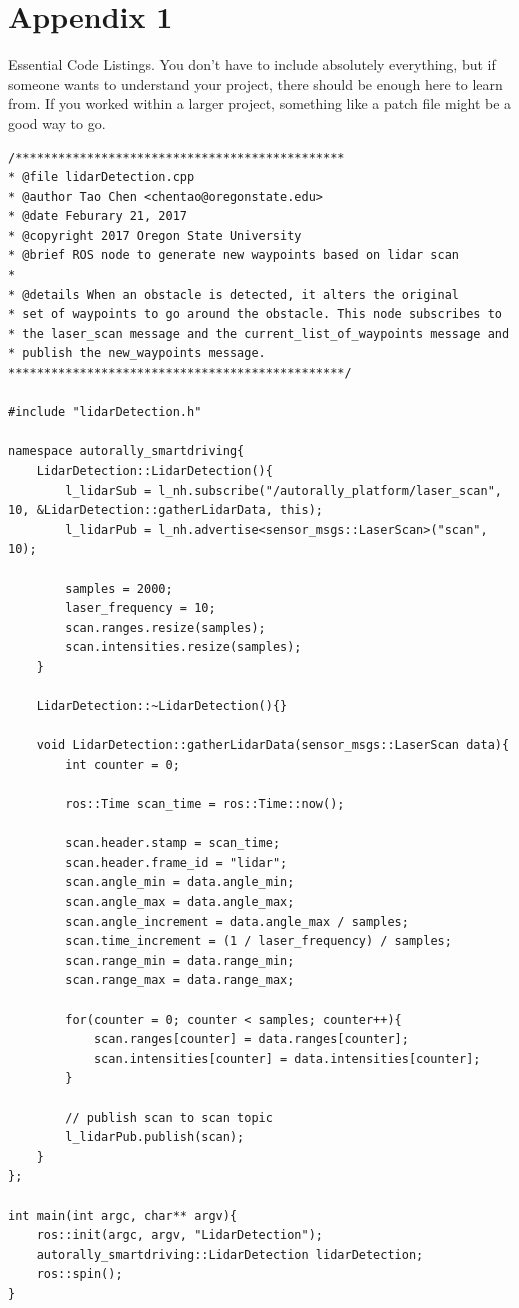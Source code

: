 \documentclass[compsoc,draftclsnofoot,onecolumn,10pt]{IEEEtran}
\begin{document}
\section{Appendix 1}
Essential Code Listings. You don't have to include absolutely everything, but if someone wants to understand your project, there should be enough here to learn from. If you worked within a larger project, something like a patch file might be a good way to go.
\begin{lstlisting}[frame=single,caption={Example Custom ROS Node}]
/**********************************************
* @file lidarDetection.cpp
* @author Tao Chen <chentao@oregonstate.edu>
* @date Feburary 21, 2017
* @copyright 2017 Oregon State University
* @brief ROS node to generate new waypoints based on lidar scan
*
* @details When an obstacle is detected, it alters the original
* set of waypoints to go around the obstacle. This node subscribes to
* the laser_scan message and the current_list_of_waypoints message and
* publish the new_waypoints message.
***********************************************/

#include "lidarDetection.h"

namespace autorally_smartdriving{
	LidarDetection::LidarDetection(){
		l_lidarSub = l_nh.subscribe("/autorally_platform/laser_scan", 10, &LidarDetection::gatherLidarData, this);
		l_lidarPub = l_nh.advertise<sensor_msgs::LaserScan>("scan", 10);

		samples = 2000;
		laser_frequency = 10;
		scan.ranges.resize(samples);
		scan.intensities.resize(samples);
	}

	LidarDetection::~LidarDetection(){}

	void LidarDetection::gatherLidarData(sensor_msgs::LaserScan data){
		int counter = 0;

		ros::Time scan_time = ros::Time::now();

		scan.header.stamp = scan_time;
		scan.header.frame_id = "lidar";
		scan.angle_min = data.angle_min;
		scan.angle_max = data.angle_max;
		scan.angle_increment = data.angle_max / samples;
		scan.time_increment = (1 / laser_frequency) / samples;
		scan.range_min = data.range_min;
		scan.range_max = data.range_max;

		for(counter = 0; counter < samples; counter++){
			scan.ranges[counter] = data.ranges[counter];
			scan.intensities[counter] = data.intensities[counter];
		}

		// publish scan to scan topic
		l_lidarPub.publish(scan);
	}
};

int main(int argc, char** argv){
	ros::init(argc, argv, "LidarDetection");
	autorally_smartdriving::LidarDetection lidarDetection;
	ros::spin();
}
\end{lstlisting}
\end{document}
